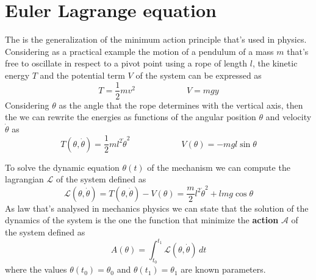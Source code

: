 \section{Euler Lagrange equation}
	The  is the generalization of the minimum action principle that's used in physics. Considering as a practical example the motion of a pendulum of a mass $m$ that's free to oscillate in respect to a pivot point using a rope of length $l$, the kinetic energy $T$ and the potential term $V$ of the system can be expressed as
	\[ T = \frac 1 2 m v^2 \qquad \qquad \qquad V = mgy \]
	Considering $\theta$ as the angle that the rope determines with the vertical axis, then the we can rewrite the energies as functions of the angular position $\theta$ and velocity $\dot \theta$ as
	\[ T(\theta,\dot \theta) = \frac 1 2 m l^2 \dot\theta^2 \qquad \qquad \qquad V(\theta) = - m gl\sin\theta \]
	
	To solve the dynamic equation $\theta(t)$ of the mechanism we can compute the lagrangian $\mathcal L$ of the system defined as
	\[ \mathcal L(\theta,\dot\theta) = T(\theta,\dot\theta)-V(\theta) = \frac m 2 l^2\dot\theta^2 + lmg\cos\theta \]
	As law that's analysed in mechanics physics we can state that the solution of the dynamics of the system is the one the function that minimize the \textbf{action} $\mathcal A$ of the system defined as
	\[ A(\theta) = \int_{t_0}^{t_1} \mathcal L(\theta,\dot\theta)\, dt \]
	where the values $\theta(t_0)= \theta_0$ and $\theta(t_1)=\theta_1$ are known parameters.
	
	
	
	
	
	
	
	
	
	
	
	
	
	
	
	
	